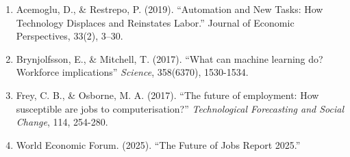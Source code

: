 \documentclass[
  11pt,
]{article}
\providecommand{\tightlist}{%
  \setlength{\itemsep}{0pt}\setlength{\parskip}{0pt}}
\begin{document}
\begin{enumerate}
\def\labelenumi{\arabic{enumi}.}
\tightlist
\item
  Acemoglu, D., \& Restrepo, P. (2019). ``Automation and New Tasks: How
  Technology Displaces and Reinstates Labor.'' Journal of Economic
  Perspectives, 33(2), 3--30.
\item
  Brynjolfsson, E., \& Mitchell, T. (2017). ``What can machine learning
  do? Workforce implications'' \emph{Science}, 358(6370), 1530-1534.
\item
  Frey, C. B., \& Osborne, M. A. (2017). ``The future of employment: How
  susceptible are jobs to computerisation?'' \emph{Technological
  Forecasting and Social Change}, 114, 254-280.
\item
  World Economic Forum. (2025). ``The Future of Jobs Report 2025.''
\end{enumerate}
\end{document}

